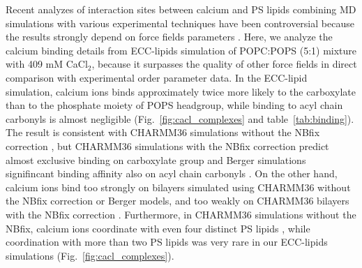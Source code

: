 \documentclass[journal=jpcbfk,manuscript=article]{achemso}
\begin{document}
Recent analyzes of interaction sites between calcium and PS lipids combining
MD simulations with various experimental techniques have been 
controversial because the results strongly depend on force fields parameters \cite{melcrova16,valentine18,hallock18}.
Here, we analyze the calcium binding details from ECC-lipids simulation of POPC:POPS (5:1) mixture with 409 mM CaCl$_2$,
because it surpasses the quality of other force fields in direct comparison with experimental order parameter data.
In the ECC-lipid simulation, calcium ions binds approximately twice more likely 
to the carboxylate than to the phosphate moiety of POPS headgroup,
while binding to acyl chain carbonyls is almost negligible (Fig.~\ref{fig:cacl_complexes} and table~\ref{tab:binding}).
The result is consistent with CHARMM36 simulations without the NBfix correction \cite{hallock18},
but CHARMM36 simulations with the NBfix correction \cite{kim16} predict almost exclusive binding on carboxylate group \cite{valentine18}
and Berger simulations signifincant binding affinity also on acyl chain carbonyls \cite{melcrova16}.
On the other hand, calcium ions bind too strongly on bilayers simulated using CHARMM36 without the NBfix correction
or Berger models, and too weakly on CHARMM36 bilayers with the NBfix correction \cite{catte16,NMRlipidsIV}.
Furthermore, in CHARMM36 simulations without the NBfix,
calcium ions coordinate with even four distinct PS lipids \cite{hallock18}, while coordination with more than two PS lipids
was very rare in our ECC-lipids simulations (Fig.~\ref{fig:cacl_complexes}).

\end{document}

